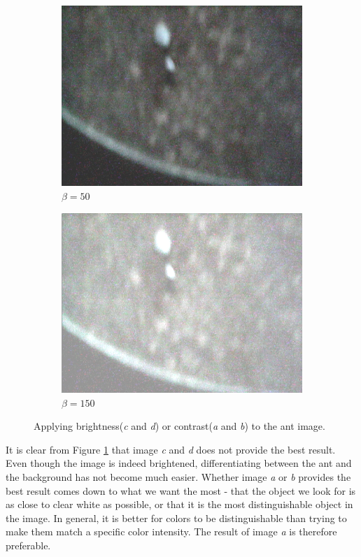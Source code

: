 \begin{figure}
\begin{subfigure}[b]{0.4\textwidth}
                \includegraphics[scale = 0.2]{img/bright50}
                \caption{$\beta = 50$}
        \end{subfigure}
		\quad
        \begin{subfigure}[b]{0.4\textwidth}
                \includegraphics[scale = 0.2]{img/bright150}
                \caption{$\beta = 150$}
        \end{subfigure}
		\caption{Applying brightness(\emph{c} and \emph{d}) or contrast(\emph{a} and \emph{b}) to the ant image.}
		\label{fig:contrast_ant}
\end{figure}

It is clear from Figure \ref{fig:contrast_ant} that image \emph{c} and \emph{d} does not provide the best result. Even though the image is indeed brightened, differentiating between the ant and the background has not become much easier. Whether image \emph{a} or \emph{b} provides the best result comes down to what we want the most - that the object we look for is as close to clear white as possible, or that it is the most distinguishable object in the image. In general, it is better for colors to be distinguishable than trying to make them match a specific color intensity. The result of image \emph{a} is therefore preferable. \\

